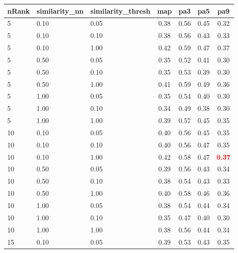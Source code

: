 \documentclass[12pt,a4paper,fleqn]{tufte-handout}
\begin{document}
 
\begin{table}                       
\begin{center}                       
\scriptsize                       
\setlength{\tabcolsep}{.16667em}                       
\begin{tabular}{lllcccc}                       
nRank & similarity\_nn & similarity\_thresh & map & pa3 & pa5 & pa9 \\                       
\hline                       
5 & 0.10 & 0.05 & 0.38 & 0.56 & 0.45 & 0.32 \\                       
5 & 0.10 & 0.10 & 0.38 & 0.56 & 0.43 & 0.33 \\                       
5 & 0.10 & 1.00 & 0.42 & 0.59 & 0.47 & 0.37 \\                       
5 & 0.50 & 0.05 & 0.35 & 0.52 & 0.41 & 0.30 \\                       
5 & 0.50 & 0.10 & 0.35 & 0.53 & 0.39 & 0.30 \\                       
5 & 0.50 & 1.00 & 0.41 & 0.59 & 0.49 & 0.36 \\                       
5 & 1.00 & 0.05 & 0.35 & 0.54 & 0.40 & 0.30 \\                       
5 & 1.00 & 0.10 & 0.34 & 0.49 & 0.38 & 0.30 \\                       
5 & 1.00 & 1.00 & 0.39 & 0.57 & 0.45 & 0.35 \\                       
10 & 0.10 & 0.05 & 0.40 & 0.56 & 0.45 & 0.35 \\                       
10 & 0.10 & 0.10 & 0.40 & 0.56 & 0.47 & 0.35 \\                       
10 & 0.10 & 1.00 & 0.42 & 0.58 & 0.47 & \textbf{\textcolor{red}{0.37}} \\                       
10 & 0.50 & 0.05 & 0.39 & 0.56 & 0.43 & 0.34 \\                       
10 & 0.50 & 0.10 & 0.38 & 0.54 & 0.43 & 0.33 \\                       
10 & 0.50 & 1.00 & 0.40 & 0.58 & 0.46 & 0.36 \\                       
10 & 1.00 & 0.05 & 0.38 & 0.54 & 0.44 & 0.34 \\                       
10 & 1.00 & 0.10 & 0.35 & 0.47 & 0.40 & 0.30 \\                       
10 & 1.00 & 1.00 & 0.38 & 0.56 & 0.44 & 0.34 \\                       
15 & 0.10 & 0.05 & 0.39 & 0.53 & 0.43 & 0.35 \\                       

\end{tabular}
\end{center}
\end{table}
\end{document}

